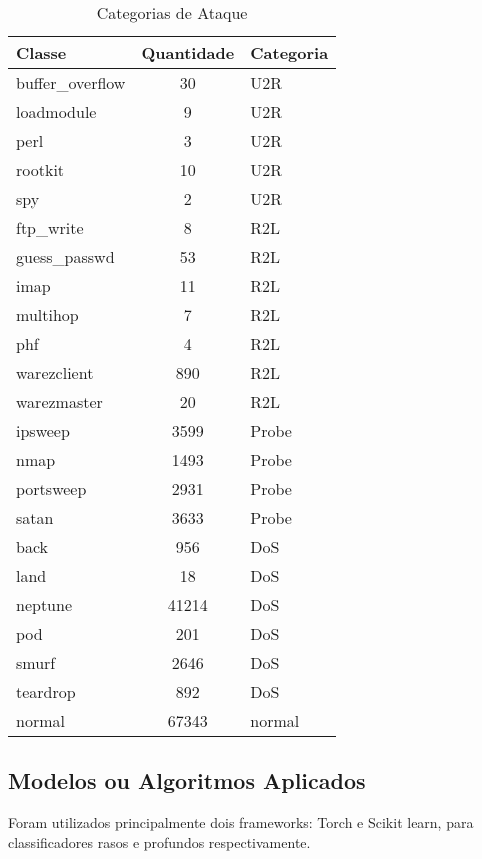\documentclass[conference]{IEEEtran}
\begin{document}
    \begin{table}[h]
    \centering
    \begin{tabular}{|l|c|l|}
    \hline
    \rowcolor[HTML]{C0C0C0} 
    \textbf{Classe} & \textbf{Quantidade} & \textbf{Categoria} \\ \hline
    buffer\_overflow & 30 & U2R \\ \hline
    loadmodule & 9 & U2R \\ \hline
    perl & 3 & U2R \\ \hline
    rootkit & 10 & U2R \\ \hline
    spy & 2 & U2R \\ \hline
    ftp\_write & 8 & R2L \\ \hline
    guess\_passwd & 53 & R2L \\ \hline
    imap & 11 & R2L \\ \hline
    multihop & 7 & R2L \\ \hline
    phf & 4 & R2L \\ \hline
    warezclient & 890 & R2L \\ \hline
    warezmaster & 20 & R2L \\ \hline
    ipsweep & 3599 & Probe \\ \hline
    nmap & 1493 & Probe \\ \hline
    portsweep & 2931 & Probe \\ \hline
    satan & 3633 & Probe \\ \hline
    back & 956 & DoS \\ \hline
    land & 18 & DoS \\ \hline
    neptune & 41214 & DoS \\ \hline
    pod & 201 & DoS \\ \hline
    smurf & 2646 & DoS \\ \hline
    teardrop & 892 & DoS \\ \hline
    normal & 67343 & normal \\ \hline
    \end{tabular}
    \caption{Categorias de Ataque}
    \label{tab:attack_datasets}
\end{table}
        

\subsection{Modelos ou Algoritmos Aplicados}

Foram utilizados principalmente dois frameworks: Torch e Scikit learn, para classificadores rasos e profundos respectivamente.
\end{document}
